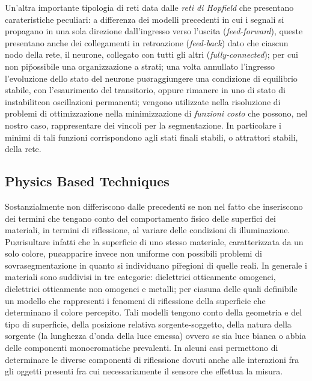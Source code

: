 Un'altra importante tipologia di reti \e data dalle {\it reti di Hopfield} che presentano 
carateristiche peculiari:
\bi
\im a differenza dei modelli precedenti in cui i segnali si propagano in una sola
    direzione dall'ingresso verso l'uscita ({\it feed-forward}), queste presentano
    anche dei collegamenti in retroazione ({\it feed-back}) dato che ciascun nodo
    della rete, il neurone, \e collegato con tutti gli altri ({\it fully-connected});
    per cui non \e pi\u possibile una organizzazione a strati;
\im una volta annullato l'ingresso l'evoluzione dello stato del neurone pu\o raggiungere
    una condizione di equilibrio stabile, con l'esaurimento del transitorio, oppure rimanere
    in uno di stato di instabilit\a con oscillazioni permanenti;
\im vengono utilizzate nella risoluzione di problemi di ottimizzazione 
    nella minimizzazione di {\it funzioni costo} che possono, nel nostro caso,
    rappresentare dei vincoli per la segmentazione.
    In particolare i minimi di tali funzioni corrispondono agli stati finali stabili,
    o attrattori stabili, della rete.
\ei
    
\subsection{Physics Based Techniques}

Sostanzialmente non differiscono dalle precedenti se non nel fatto che inseriscono
dei termini che tengano conto del comportamento fisico delle superfici dei materiali,
in termini di riflessione, al variare delle condizioni di illuminazione.
Pu\o risultare infatti che la superficie di uno stesso materiale, caratterizzata
da un solo colore, pu\o apparire invece non uniforme con possibili problemi di
sovrasegmentazione in quanto si individuano pi\u regioni di quelle reali.
In generale i materiali sono suddivisi in tre categorie: dielettrici otticamente omogenei,
dielettrici otticamente non omogenei e metalli; per ciasuna delle quali \e definibile
un modello che rappresenti i fenomeni di riflessione della superficie che determinano il
colore percepito.
Tali modelli tengono conto della geometria e del tipo di superficie, della posizione relativa
sorgente-soggetto, della natura della sorgente (la lunghezza d'onda della luce emessa)
ovvero se sia luce bianca o abbia delle componenti monocromatiche prevalenti.
In alcuni casi permettono di determinare le diverse componenti di riflessione dovuti
anche alle interazioni fra gli oggetti presenti fra cui necessariamente il sensore che
effettua la misura. 

